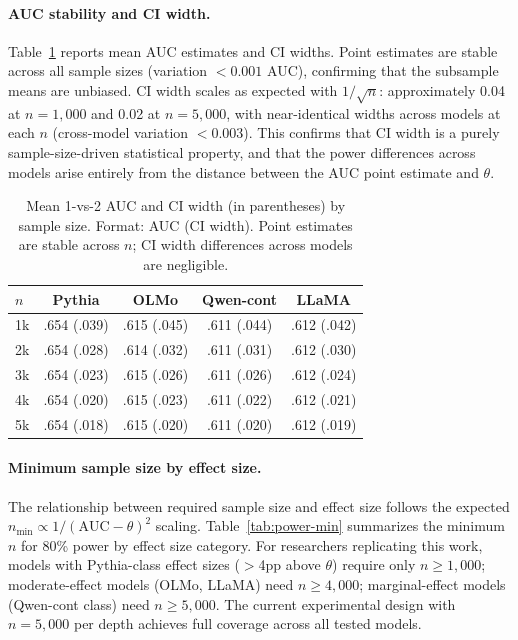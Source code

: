 \documentclass[11pt,a4paper]{article}
\begin{document}
\paragraph{AUC stability and CI width.} Table~\ref{tab:power-auc} reports mean AUC estimates and CI widths. Point estimates are stable across all sample sizes (variation $< 0.001$ AUC), confirming that the subsample means are unbiased. CI width scales as expected with $1/\sqrt{n}$: approximately 0.04 at $n = 1{,}000$ and 0.02 at $n = 5{,}000$, with near-identical widths across models at each $n$ (cross-model variation $< 0.003$). This confirms that CI width is a purely sample-size-driven statistical property, and that the power differences across models arise entirely from the distance between the AUC point estimate and $\theta$.

\begin{table}[t]
\centering
\small
\begin{tabular}{lcccc}
\toprule
$n$ & \textbf{Pythia} & \textbf{OLMo} & \textbf{Qwen-cont} & \textbf{LLaMA} \\
\midrule
1k & .654 (.039) & .615 (.045) & .611 (.044) & .612 (.042) \\
2k & .654 (.028) & .614 (.032) & .611 (.031) & .612 (.030) \\
3k & .654 (.023) & .615 (.026) & .611 (.026) & .612 (.024) \\
4k & .654 (.020) & .615 (.023) & .611 (.022) & .612 (.021) \\
5k & .654 (.018) & .615 (.020) & .611 (.020) & .612 (.019) \\
\bottomrule
\end{tabular}
\caption{Mean 1-vs-2 AUC and CI width (in parentheses) by sample size. Format: AUC (CI width). Point estimates are stable across $n$; CI width differences across models are negligible.}
\label{tab:power-auc}
\end{table}

\paragraph{Minimum sample size by effect size.} The relationship between required sample size and effect size follows the expected $n_\text{min} \propto 1/(\text{AUC} - \theta)^2$ scaling. Table~\ref{tab:power-min} summarizes the minimum $n$ for 80\% power by effect size category. For researchers replicating this work, models with Pythia-class effect sizes ($>$4pp above $\theta$) require only $n \geq 1{,}000$; moderate-effect models (OLMo, LLaMA) need $n \geq 4{,}000$; marginal-effect models (Qwen-cont class) need $n \geq 5{,}000$. The current experimental design with $n = 5{,}000$ per depth achieves full coverage across all tested models.
\end{document}
